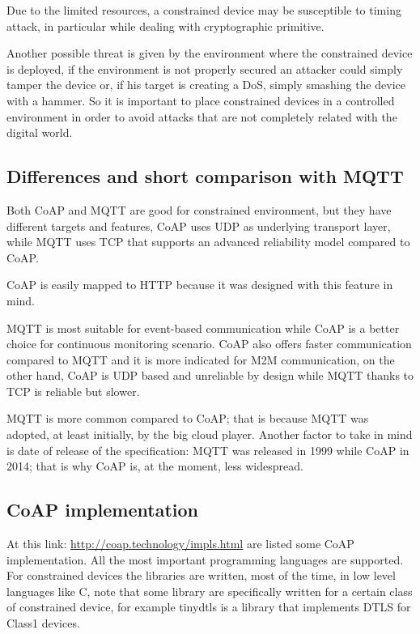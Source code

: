	Due to the limited resources, a constrained device may be susceptible to timing attack, in particular while dealing with cryptographic primitive.\newline
	
	Another possible threat is given by the environment where the constrained device is deployed, if the environment is not properly secured an attacker could simply tamper the device or, if his target is creating a DoS, simply smashing the device with a hammer.\newline
	So it is important to place constrained devices in a controlled environment in order to avoid attacks that are not completely related with the digital world.\newline
	
	\subsection{Differences and short comparison with MQTT}
	Both CoAP and MQTT are good for constrained environment, but they have different targets and features, CoAP uses UDP as underlying transport layer, while MQTT uses TCP that supports an advanced reliability model compared to CoAP.\newline
	
	CoAP is easily mapped to HTTP because it was designed with this feature in mind.\newline
	
	MQTT is most suitable for event-based communication while CoAP is a better choice for continuous monitoring scenario.\newline
	CoAP also offers faster communication compared to MQTT and it is more indicated for M2M communication, on the other hand, CoAP is UDP based and unreliable by design while MQTT thanks to TCP is reliable but slower.\newline
	
	MQTT is more common compared to CoAP; that is because MQTT was adopted, at least initially, by the big cloud player.\newline
	Another factor to take in mind is date of release of the specification: MQTT was released in 1999 while CoAP in 2014; that is why CoAP is, at the moment, less widespread.\newline
	
	\subsection{CoAP implementation}
	At this link: \url{http://coap.technology/impls.html} are listed some CoAP implementation.\newline
	All the most important programming languages are supported.\newline
	For constrained devices the libraries are written, most of the time, in low level languages like C, note that some library are specifically written for a certain class of constrained device, for example tinydtls is a library that implements DTLS for Class1 devices.\newline
	
